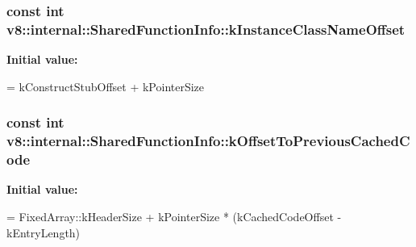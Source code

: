 \subsubsection[{\texorpdfstring{k\+Instance\+Class\+Name\+Offset}{kInstanceClassNameOffset}}]{\setlength{\rightskip}{0pt plus 5cm}const int v8\+::internal\+::\+Shared\+Function\+Info\+::k\+Instance\+Class\+Name\+Offset\hspace{0.3cm}{\ttfamily [static]}}\hypertarget{classv8_1_1internal_1_1_shared_function_info_a8157b1da28ec80de7d2881c7b888c9fe}{}\label{classv8_1_1internal_1_1_shared_function_info_a8157b1da28ec80de7d2881c7b888c9fe}
{\bfseries Initial value\+:}
\begin{DoxyCode}
=
      kConstructStubOffset + kPointerSize
\end{DoxyCode}
\subsubsection[{\texorpdfstring{k\+Offset\+To\+Previous\+Cached\+Code}{kOffsetToPreviousCachedCode}}]{\setlength{\rightskip}{0pt plus 5cm}const int v8\+::internal\+::\+Shared\+Function\+Info\+::k\+Offset\+To\+Previous\+Cached\+Code\hspace{0.3cm}{\ttfamily [static]}}\hypertarget{classv8_1_1internal_1_1_shared_function_info_a0b6c3cf1e22f7b71c820b4c01a8f0571}{}\label{classv8_1_1internal_1_1_shared_function_info_a0b6c3cf1e22f7b71c820b4c01a8f0571}
{\bfseries Initial value\+:}
\begin{DoxyCode}
=
      FixedArray::kHeaderSize +
      kPointerSize * (kCachedCodeOffset - kEntryLength)
\end{DoxyCode}
